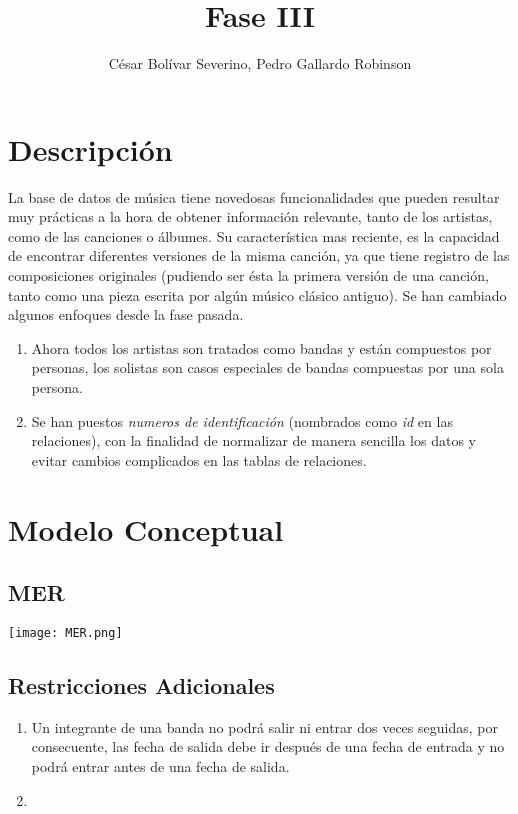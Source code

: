 \documentclass[10pt,a4paper]{article}
\author{César Bolívar Severino, Pedro Gallardo Robinson} %
\title{Fase III}
\begin{document}
\maketitle

\section{Descripción}

La base de datos de música tiene novedosas funcionalidades que pueden resultar muy prácticas a la hora de obtener información relevante, tanto de los artistas, como de las canciones o álbumes.
Su característica mas reciente, es la capacidad de encontrar diferentes versiones de la misma canción, ya que tiene registro de las composiciones originales (pudiendo ser ésta la primera versión de una canción, tanto como una pieza escrita por algún músico clásico antiguo). 
\newline
Se han cambiado algunos enfoques desde la fase pasada.
\begin{enumerate}
	\item Ahora todos los artistas son tratados como bandas y están compuestos por personas, los solistas son casos especiales de bandas compuestas por una sola persona.
	\item Se han puestos \textit{numeros de identificación} (nombrados como \textit{id} en las relaciones), con la finalidad de normalizar de manera sencilla los datos y evitar cambios complicados en las tablas de relaciones.
\end{enumerate}

\newpage

\section{Modelo Conceptual}

\subsection{MER}
\begin{center}
\texttt{[image: MER.png]}
\end{center}

\subsection{Restricciones Adicionales}
 \begin{enumerate}
 \item Un integrante de una banda no podrá salir ni entrar dos veces seguidas, por consecuente, las fecha de salida debe ir después de una fecha de entrada y no podrá entrar antes de una fecha de salida.
 \item 
 \end{enumerate}
\newpage
\end{document}
